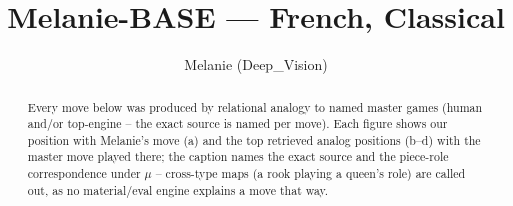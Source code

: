 \documentclass[11pt]{article}
\title{Melanie-BASE — French, Classical}
\author{Melanie (Deep\_Vision)}
\date{}
\begin{document}
\maketitle

\begin{abstract}Every move below was produced by relational analogy to named master games (human and/or top-engine -- the exact source is named per move). Each figure shows our position with Melanie's move (a) and the top retrieved analog positions (b--d) with the master move played there; the caption names the exact source and the piece-role correspondence under $\mu$ -- cross-type maps (a rook playing a queen's role) are called out, as no material/eval engine explains a move that way.\end{abstract}

\begin{figure}[p]\centering
\begin{subfigure}{0.46\textwidth}\centering
\resizebox{\linewidth}{!}{%
\newchessgame
\chessboard[
  setfen={rnb1k2r/pppnqppp/4p3/3pP3/3P1P2/2N5/PPP3PP/R2QKBNR b KQkq - 0 7},
  showmover=false,
  pgfstyle=straightmove, color=movearrow, markmove={a7-a6}
]}
\caption{}
\end{subfigure}\hfill
\begin{subfigure}{0.46\textwidth}\centering
\resizebox{\linewidth}{!}{%
\newchessgame
\chessboard[
  setfen={rnb1k2r/pppnqppp/4p3/3pP3/3P1P2/2N5/PPP3PP/R2QKBNR b KQkq - 0 7},
  showmover=false,
  pgfstyle=straightmove, color=movearrow, markmove={a7-a6}
]}
\caption{}
\end{subfigure}
\\[4pt]
\begin{subfigure}{0.46\textwidth}\centering
\resizebox{\linewidth}{!}{%
\newchessgame
\chessboard[
  setfen={rnb1k2r/pppnqppp/4p3/3pP3/3P1P2/2N5/PPP3PP/R2QKBNR b KQkq - 0 7},
  showmover=false,
  pgfstyle=straightmove, color=movearrow, markmove={a7-a6}
]}
\caption{}
\end{subfigure}\hfill
\begin{subfigure}{0.46\textwidth}\centering
\resizebox{\linewidth}{!}{%
\newchessgame
\chessboard[
  setfen={rnb1k2r/pppnqppp/4p3/3pP3/3P1P2/2N5/PPP3PP/R2QKBNR b KQkq - 0 7},
  showmover=false,
  pgfstyle=straightmove, color=movearrow, markmove={a7-a6}
]}
\caption{}
\end{subfigure}

\end{figure}
\end{document}
